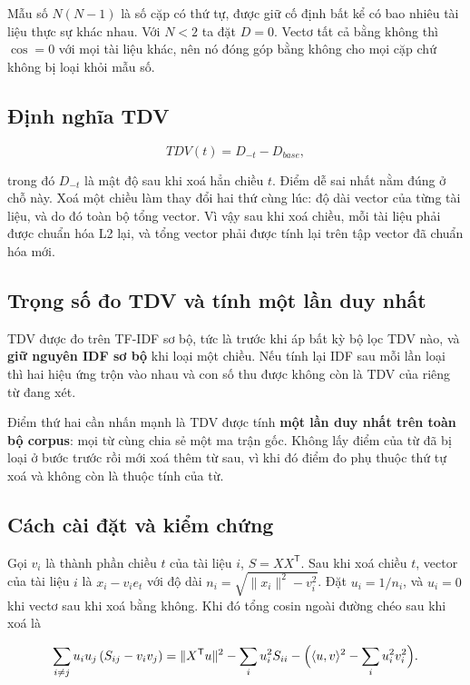 Mẫu số $N(N-1)$ là số cặp có thứ tự, được giữ cố định bất kể có bao nhiêu tài
liệu thực sự khác nhau. Với $N<2$ ta đặt $D=0$. Vectơ tất cả bằng không thì
$\cos=0$ với mọi tài liệu khác, nên nó đóng góp bằng không cho mọi cặp chứ không
bị loại khỏi mẫu số.

\subsection{Định nghĩa TDV}

\begin{equation}
TDV(t)=D_{-t}-D_{base},
\end{equation}

trong đó $D_{-t}$ là mật độ sau khi xoá hẳn chiều $t$. Điểm dễ sai nhất nằm
đúng ở chỗ này. Xoá một chiều làm thay đổi hai thứ cùng lúc: độ dài vector của
từng tài liệu, và do đó toàn bộ tổng vector. Vì vậy sau khi xoá chiều, mỗi tài
liệu phải được chuẩn hóa L2 lại, và tổng vector phải được tính lại trên tập
vector đã chuẩn hóa mới.

\subsection{Trọng số đo TDV và tính một lần duy nhất}

TDV được đo trên TF-IDF sơ bộ, tức là trước khi áp bất kỳ bộ lọc TDV nào, và
\textbf{giữ nguyên IDF sơ bộ} khi loại một chiều. Nếu tính lại IDF sau mỗi lần
loại thì hai hiệu ứng trộn vào nhau và con số thu được không còn là TDV của riêng
từ đang xét.

Điểm thứ hai cần nhấn mạnh là TDV được tính \textbf{một lần duy nhất trên toàn
bộ corpus}: mọi từ cùng chia sẻ một ma trận gốc. Không lấy điểm của từ đã bị loại
ở bước trước rồi mới xoá thêm từ sau, vì khi đó điểm đo phụ thuộc thứ tự xoá và
không còn là thuộc tính của từ.

\subsection{Cách cài đặt và kiểm chứng}

Gọi $v_i$ là thành phần chiều $t$ của tài liệu $i$, $S=X X^{\mathsf T}$. Sau khi
xoá chiều $t$, vector của tài liệu $i$ là $x_i - v_i e_t$ với độ dài
$n_i=\sqrt{\lVert x_i\rVert^2-v_i^2}$. Đặt $u_i=1/n_i$, và $u_i=0$ khi vectơ sau
khi xoá bằng không. Khi đó tổng cosin ngoài đường chéo sau khi xoá là

\begin{equation}
\sum_{i\neq j} u_iu_j\,(S_{ij}-v_iv_j)
= \lVert X^{\mathsf T}u\rVert^2 - \sum_i u_i^2 S_{ii}
- \Bigl(\langle u,v\rangle^2-\sum_i u_i^2 v_i^2\Bigr).
\end{equation}

